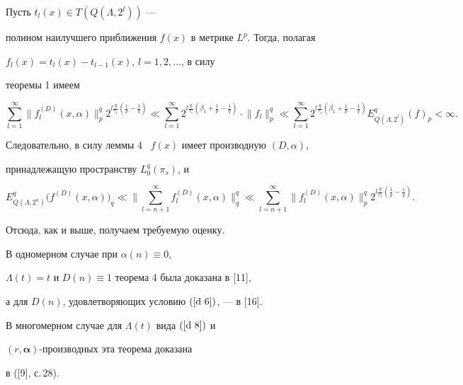 \begin{pf}


Пусть $t_l(x)\in T(Q(\Lambda,2^l))$ ---


полином наилучшего приближения $f(x)$ в метрике $L^p$. Тогда, полагая 


$f_l(x)=t_l(x)-t_{l-1}(x)$, $l=1,2,\dotsc$, в силу 


теоремы 1 имеем 


$$


\sum_{l=1}^\infty \big\|f_l^{(D)}(x,\alpha)


\big\|^q_p 2^{l{\frac{q}{\tau_1}}({\frac{1}{p}}-{\frac{1}{q}})}


\ll \sum_{l=1}^\infty 2^{l{\frac{q}{\tau_1}}(\beta_1+{\frac{1}


{p}}-{\frac{1}{q}})} \cdot \big\|f_l\big\|^q_p \ll 


\sum_{l=1}^\infty 2^{l{\frac{q}{\tau_1}}(\beta_1+{\frac{1}


{p}}-{\frac{1}{q}})} E_{Q(\Lambda,2^l)}^q(f)_p<\infty.


$$


Следовательно, в силу леммы 4 \ $f(x)$ имеет производную $(D, \alpha)$, 


принадлежащую пространству $L_0^q(\pi_s)$, и 


$$


E_{Q(\Lambda,2^n)}^q \big( f^{(D)}(x,\alpha)\big)_q \ll


\bigg\|\sum_{l=n+1}^\infty f_l^{(D)}(x,\alpha) \bigg\|^q_q \ll 


\sum_{l=n+1}^\infty \big\| f_l^{(D)}(x, \alpha)\big\|^q_p


 2^{l{\frac{q}{\tau_1}}({\frac{1}{p}}-{\frac{1}{q}})}.


$$


Отсюда, как и выше, получаем требуемую оценку.


\end{pf}





\begin{note}


В одномерном случае при $ \alpha(n)\equiv 0$, 


$\Lambda(t)=t$ и $D(n)\equiv 1$ теорема 4 была доказана в [11], 


а для $D(n)$, удовлетворяющих условию $(\ref {d 6})$, --- в [16].


В многомерном случае для $\Lambda(t)$ вида $(\ref {d 8})$ и 


$(r, {\boldsymbol{\alpha}})$-производных эта теорема доказана 


в ([9], с.\,28).


\end{note}





